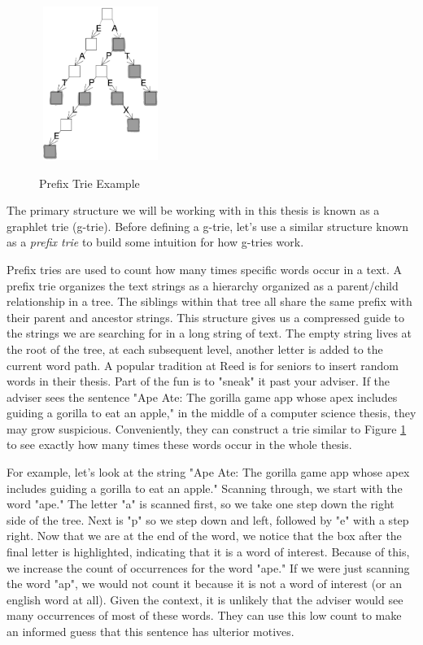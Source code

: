 \documentclass[12pt,twoside]{reedthesis}
\begin{document}
\begin{figure}[h]
	\caption{Prefix Trie Example}
	\centering
	\includegraphics[width=4cm, height=5cm]{trie}
	\label{fig:trie}
\end{figure}

The primary structure we will be working with in this thesis is known as a graphlet trie (g-trie). Before defining a g-trie, let's use a similar structure known as a \textit{prefix trie} to build some intuition for how g-tries work.

Prefix tries are used to count how many times specific words occur in a text. A prefix trie organizes the text strings as a hierarchy organized as a parent/child relationship in a tree. The siblings within that tree all share the same prefix with their parent and ancestor strings. This structure gives us a compressed guide to the strings we are searching for in a long string of text. The empty string lives at the root of the tree, at each subsequent level, another letter is added to the current word path. A popular tradition at Reed is for seniors to insert random words in their thesis. Part of the fun is to "sneak" it past your adviser. If the adviser sees the sentence "Ape Ate: The gorilla game app whose apex includes guiding a gorilla to eat an apple," in the middle of a computer science thesis, they may grow suspicious. Conveniently, they can construct a trie similar to Figure \ref{fig:trie}  to see exactly how many times these words occur in the whole thesis. 

For example, let's look at the string "Ape Ate: The gorilla game app whose apex includes guiding a gorilla to eat an apple." Scanning through, we start with the word "ape." The letter "a" is scanned first, so we take one step down the right side of the tree. Next is "p" so we step down and left, followed by "e" with a step right. Now that we are at the end of the word, we notice that the box after the final letter is highlighted, indicating that it is a word of interest. Because of this, we increase the count of occurrences for the word "ape." If we were just scanning the word "ap", we would not count it because it is not a word of interest (or an english word at all). Given the context, it is unlikely that the adviser would see many occurrences of most of these words. They can use this low count to make an informed guess that this sentence has ulterior motives.
\end{document}
